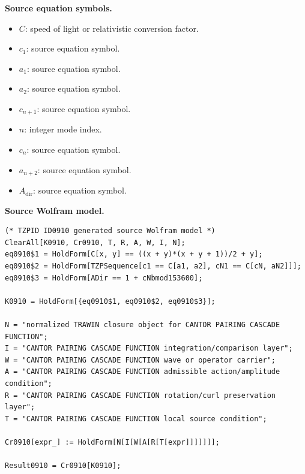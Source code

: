 \begin{minipage}[t]{0.49\linewidth}
\begingroup
\small
\raggedright
\textbf{Source equation symbols.}\par
\begin{itemize}[leftmargin=1.35em,itemsep=1pt,topsep=1pt,parsep=0pt]
    \item $C$: speed of light or relativistic conversion factor.
    \item $c_1$: source equation symbol.
    \item $a_1$: source equation symbol.
    \item $a_2$: source equation symbol.
    \item $c_{n+1}$: source equation symbol.
    \item $n$: integer mode index.
    \item $c_n$: source equation symbol.
    \item $a_{n+2}$: source equation symbol.
    \item $A_{\mathrm{dir}}$: source equation symbol.
\end{itemize}
\endgroup
\end{minipage}\hfill
\begin{minipage}[t]{0.47\linewidth}
\begingroup
\scriptsize
\raggedright
\textbf{Source Wolfram model.}\par
\begin{Verbatim}[fontsize=\tiny,breaklines=true,breakanywhere=true]
(* TZPID ID0910 generated source Wolfram model *)
ClearAll[K0910, Cr0910, T, R, A, W, I, N];
eq0910$1 = HoldForm[C[x, y] == ((x + y)*(x + y + 1))/2 + y];
eq0910$2 = HoldForm[TZPSequence[c1 == C[a1, a2], cN1 == C[cN, aN2]]];
eq0910$3 = HoldForm[ADir == 1 + cNbmod153600];

K0910 = HoldForm[{eq0910$1, eq0910$2, eq0910$3}];

N = "normalized TRAWIN closure object for CANTOR PAIRING CASCADE FUNCTION";
I = "CANTOR PAIRING CASCADE FUNCTION integration/comparison layer";
W = "CANTOR PAIRING CASCADE FUNCTION wave or operator carrier";
A = "CANTOR PAIRING CASCADE FUNCTION admissible action/amplitude condition";
R = "CANTOR PAIRING CASCADE FUNCTION rotation/curl preservation layer";
T = "CANTOR PAIRING CASCADE FUNCTION local source condition";

Cr0910[expr_] := HoldForm[N[I[W[A[R[T[expr]]]]]]];

Result0910 = Cr0910[K0910];
\end{Verbatim}
\endgroup
\end{minipage}

